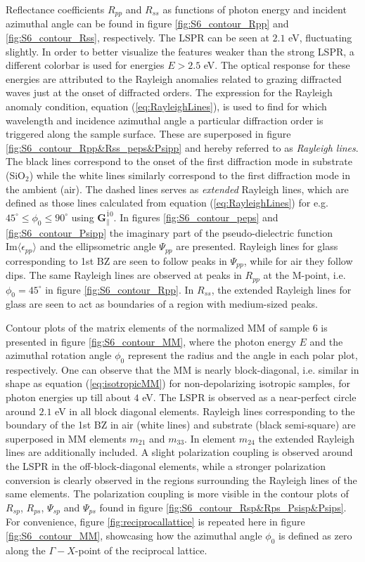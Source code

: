 Reflectance coefficients $R_{pp}$ and $R_{ss}$ as functions of photon energy and incident azimuthal angle can be found in figure \ref{fig:S6_contour_Rpp} and \ref{fig:S6_contour_Rss}, respectively. The LSPR can be seen at $2.1$ eV, fluctuating slightly. In order to better visualize the features weaker than the strong LSPR, a different colorbar is used for energies $E>2.5$ eV. The optical response for these energies are attributed to the Rayleigh anomalies related to grazing diffracted waves just at the onset of diffracted orders\cite{Brakstad:15}. The expression for the Rayleigh anomaly condition, equation (\ref{eq:RayleighLines}), is used to find for which wavelength and incidence azimuthal angle a particular diffraction order is triggered along the sample surface. These are superposed in figure \ref{fig:S6_contour_Rpp&Rss_peps&Psipp} and hereby referred to as \emph{Rayleigh lines}. The black lines correspond to the onset of the first diffraction mode in substrate (SiO$_2$) while the white lines similarly correspond to the first diffraction mode in the ambient (air). The dashed lines serves as \emph{extended} Rayleigh lines, which are defined as those lines calculated from equation (\ref{eq:RayleighLines}) for e.g. $45^\circ \leq \phi_0 \leq 90^\circ$ using $\mathbf{G}_\parallel^{\bar{1}0}$. In figures \ref{fig:S6_contour_peps} and \ref{fig:S6_contour_Psipp} the imaginary part of the pseudo-dielectric function $\text{Im}\langle\epsilon_{pp}\rangle$ and the ellipsometric angle $\Psi_{pp}$ are presented. Rayleigh lines for glass corresponding to 1st BZ are seen to follow peaks in $\Psi_{pp}$, while for air they follow dips. The same Rayleigh lines are observed at peaks in $R_{pp}$ at the M-point, i.e. $\phi_0=45^\circ$ in figure \ref{fig:S6_contour_Rpp}. In $R_{ss}$, the extended Rayleigh lines for glass are seen to act as boundaries of a region with medium-sized peaks.


Contour plots of the matrix elements of the normalized MM of sample 6 is presented in figure \ref{fig:S6_contour_MM}, where the photon energy $E$ and the azimuthal rotation angle $\phi_0$ represent the radius and the angle in each polar plot, respectively. One can observe that the MM is nearly block-diagonal, i.e. similar in shape as equation (\ref{eq:isotropicMM}) for non-depolarizing isotropic samples, for photon energies up till about $4$ eV. The LSPR is observed as a near-perfect circle around $2.1$ eV in all block diagonal elements. Rayleigh lines corresponding to the boundary of the 1st BZ in air (white lines) and substrate (black semi-square) are superposed in MM elements $m_{21}$ and $m_{33}$. In element $m_{24}$ the extended Rayleigh lines are additionally included. A slight polarization coupling is observed around the LSPR in the off-block-diagonal elements, while a stronger polarization conversion is clearly observed in the regions surrounding the Rayleigh lines of the same elements. The polarization coupling is more visible in the contour plots of $R_{sp}$, $R_{ps}$, $\Psi_{sp}$ and $\Psi_{ps}$ found in figure \ref{fig:S6_contour_Rsp&Rps_Psisp&Psips}. For convenience, figure \ref{fig:reciprocallattice} is repeated here in figure \ref{fig:S6_contour_MM}, showcasing how the azimuthal angle $\phi_0$ is defined as zero along the $\Gamma-X$-point of the reciprocal lattice.

